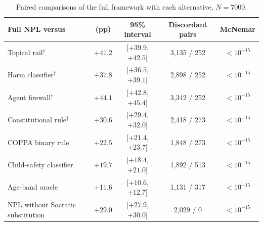 \begin{table}[H]
\caption{Paired comparisons of the full framework with each alternative, $N = 7000$.\label{tab:stats}}
\small
\begin{tabularx}{\textwidth}{Lcccc}
\toprule
\textbf{Full NPL versus} & \boldmath{$\Delta$} \textbf{(pp)} & \textbf{95\% interval} & \textbf{Discordant pairs} & \textbf{McNemar}  \\
\midrule
Topical rail$^{\dagger}$ & $+41.2$ & [$+39.9$, $+42.5$] & 3{,}135 / 252 & $< 10^{-15}$ \\
Harm classifier$^{\dagger}$ & $+37.8$ & [$+36.5$, $+39.1$] & 2{,}898 / 252 & $< 10^{-15}$ \\
Agent firewall$^{\dagger}$ & $+44.1$ & [$+42.8$, $+45.4$] & 3{,}342 / 252 & $< 10^{-15}$ \\
Constitutional rule$^{\dagger}$ & $+30.6$ & [$+29.4$, $+32.0$] & 2{,}418 / 273 & $< 10^{-15}$ \\
COPPA binary rule & $+22.5$ & [$+21.4$, $+23.7$] & 1{,}848 / 273 & $< 10^{-15}$ \\
Child-safety classifier & $+19.7$ & [$+18.4$, $+21.0$] & 1{,}892 / 513 & $< 10^{-15}$ \\
Age-band oracle & $+11.6$ & [$+10.6$, $+12.7$] & 1{,}131 / 317 & $< 10^{-15}$ \\
NPL without Socratic substitution & $+29.0$ & [$+27.9$, $+30.0$] & 2{,}029 / 0 & $< 10^{-15}$ \\
\bottomrule
\end{tabularx}
\end{table}
